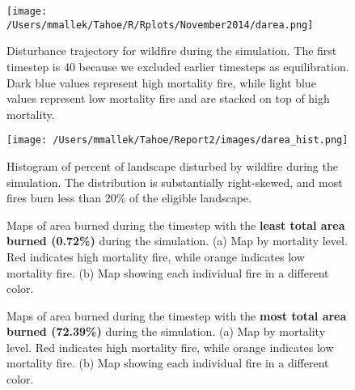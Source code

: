 \begin{figure}[!htbp]
\centering
\texttt{[image: /Users/mmallek/Tahoe/R/Rplots/November2014/darea.png]}
\caption{Disturbance trajectory for wildfire during the simulation. The first timestep is 40 because we excluded earlier timesteps as equilibration. Dark blue values represent high mortality fire, while light blue values represent low mortality fire and are stacked on top of high mortality.}
\label{fig:darea}
\end{figure}

\begin{figure}[!htbp]
\centering
\texttt{[image: /Users/mmallek/Tahoe/Report2/images/darea\_hist.png]}
\caption{Histogram of percent of landscape disturbed by wildfire during the simulation. The distribution is substantially right-skewed, and most fires burn less than 20\% of the eligible landscape.}
\label{fig:darea_hist}
\end{figure}

\begin{figure}[!htbp]
  \centering
  \caption{Maps of area burned during the timestep with the \textbf{least total area burned (0.72\%)} during the simulation. (a) Map by mortality level. Red indicates high mortality fire, while orange indicates low mortality fire. (b) Map showing each individual fire in a different color.}
  \label{fig:darea_min_map}
\end{figure}

\begin{figure}[!htbp]
  \centering
  \caption{Maps of area burned during the timestep with the \textbf{most total area burned (72.39\%)} during the simulation. (a) Map by mortality level. Red indicates high mortality fire, while orange indicates low mortality fire. (b) Map showing each individual fire in a different color.}
  \label{fig:darea_max_map}
\end{figure}


